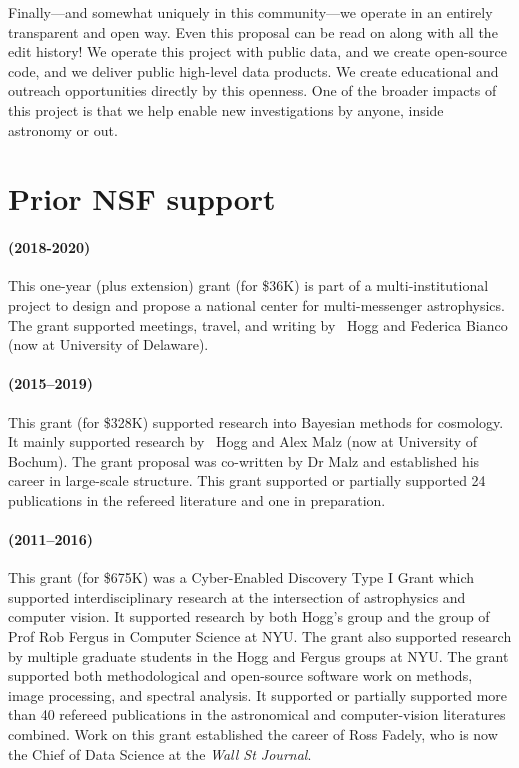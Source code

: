 \documentclass[12pt, letterpaper]{article}
\begin{document}
Finally---and somewhat uniquely in this community---we operate in an entirely transparent and open way.
Even this proposal can be read on  along with all the edit history!
We operate this project with public data, and we create open-source code, and we deliver public
high-level data products.
We create educational and outreach opportunities directly by this openness.
One of the broader impacts of this project is that we help enable new investigations by anyone, inside astronomy or out.

\section{Prior NSF support}

\paragraph{
 (2018-2020)}
This one-year (plus extension) grant (for \$36K) is part of a multi-institutional project
to design and propose a national center for multi-messenger astrophysics. The grant supported
meetings, travel, and writing by \PI\ Hogg and Federica Bianco (now at University of Delaware).

\paragraph{
(2015--2019)} This grant (for \$328K) supported research into Bayesian
methods for cosmology. It mainly supported research by \PI\ Hogg and
Alex Malz (now at University of Bochum). The grant proposal was co-written
by Dr Malz and established his career in large-scale structure.
This grant supported or partially supported 24 publications
in the refereed literature and one in preparation.

\paragraph{
 (2011--2016)}
This grant (for \$675K) was a Cyber-Enabled Discovery Type I Grant
which supported interdisciplinary research at the intersection of
astrophysics and computer vision.  It supported research by both
Hogg's group and the group of Prof Rob Fergus in Computer Science at
NYU.
The grant also supported research by multiple graduate students in the
Hogg and Fergus groups at NYU.
The grant supported both methodological and open-source software work
on  methods, image processing, and spectral analysis.
It supported or partially supported
more than 40 refereed publications in the astronomical and
computer-vision literatures combined.
Work on this grant established the career of Ross Fadely, who is now the
Chief of Data Science at the \textit{Wall St Journal}.
\end{document}
